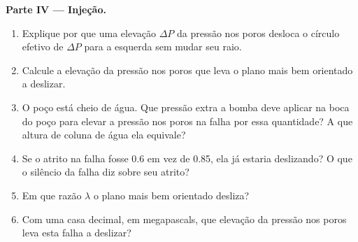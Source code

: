 \begin{problem}
\medskip
\noindent\textbf{Parte IV --- Injeção.}
\begin{enumerate}[resume]
  \item Explique por que uma elevação $\Delta P$ da pressão nos poros desloca o círculo efetivo de $\Delta P$ para a esquerda sem mudar seu raio.
  \item Calcule a elevação da pressão nos poros que leva o plano mais bem orientado a deslizar.
  \item O poço está cheio de água. Que pressão extra a bomba deve aplicar na boca do poço para elevar a pressão nos poros na falha por essa quantidade? A que altura de coluna de água ela equivale?
  \item Se o atrito na falha fosse 0.6 em vez de 0.85, ela já estaria deslizando? O que o silêncio da falha diz sobre seu atrito?
  \item Em que razão $\lambda$ o plano mais bem orientado desliza?
  \item Com uma casa decimal, em megapascals, que elevação da pressão nos poros leva esta falha a deslizar?
\end{enumerate}
\end{problem}
